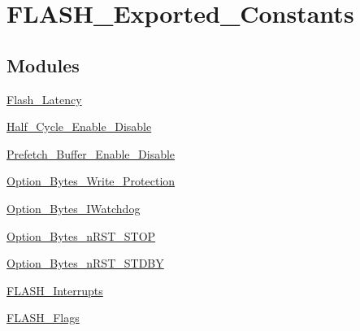 \hypertarget{group__FLASH__Exported__Constants}{
\section{FLASH\_\-Exported\_\-Constants}
\label{group__FLASH__Exported__Constants}
}
\subsection*{Modules}
\begin{DoxyCompactItemize}
\item 
\hyperlink{group__Flash__Latency}{Flash\_\-Latency}
\item 
\hyperlink{group__Half__Cycle__Enable__Disable}{Half\_\-Cycle\_\-Enable\_\-Disable}
\item 
\hyperlink{group__Prefetch__Buffer__Enable__Disable}{Prefetch\_\-Buffer\_\-Enable\_\-Disable}
\item 
\hyperlink{group__Option__Bytes__Write__Protection}{Option\_\-Bytes\_\-Write\_\-Protection}
\item 
\hyperlink{group__Option__Bytes__IWatchdog}{Option\_\-Bytes\_\-IWatchdog}
\item 
\hyperlink{group__Option__Bytes__nRST__STOP}{Option\_\-Bytes\_\-nRST\_\-STOP}
\item 
\hyperlink{group__Option__Bytes__nRST__STDBY}{Option\_\-Bytes\_\-nRST\_\-STDBY}
\item 
\hyperlink{group__FLASH__Interrupts}{FLASH\_\-Interrupts}
\item 
\hyperlink{group__FLASH__Flags}{FLASH\_\-Flags}
\end{DoxyCompactItemize}
